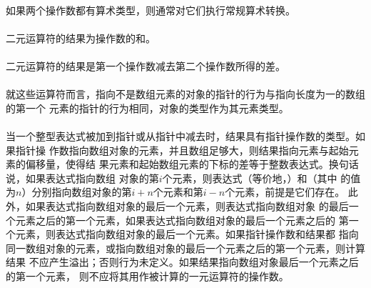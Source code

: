 {\semantic
\paragraph{}
如果两个操作数都有算术类型，则通常对它们执行常规算术转换。

\paragraph{}
二元\tm{+}运算符的结果为操作数的和。

\paragraph{}
二元\tm{-}运算符的结果是第一个操作数减去第二个操作数所得的差。

\paragraph{}
就这些运算符而言，指向不是数组元素的对象的指针的行为与指向长度为一的数组的第一个
元素的指针的行为相同，对象的类型作为其元素类型。

\paragraph{}
当一个整型表达式被加到指针或从指针中减去时，结果具有指针操作数的类型。如果指针操
作数指向数组对象的元素，并且数组足够大，则结果指向元素与起始元素的偏移量，使得结
果元素和起始数组元素的下标的差等于整数表达式。换句话说，如果表达式指向数组
对象的第$i$个元素，则表达式（等价地，）和（其中
的值为$n$）分别指向数组对象的第$i+n$个元素和第$i-n$个元素，前提是它们存在。
此外，如果表达式指向数组对象的最后一个元素，则表达式指向数组对象
的最后一个元素之后的第一个元素，如果表达式指向数组对象的最后一个元素之后的
第一个元素，则表达式指向数组对象的最后一个元素。如果指针操作数和结果都
指向同一数组对象的元素，或指向数组对象的最后一个元素之后的第一个元素，则计算结果
不应产生溢出；否则行为未定义。如果结果指向数组对象最后一个元素之后的第一个元素，
则不应将其用作被计算的一元\tm{*}运算符的操作数。

}
